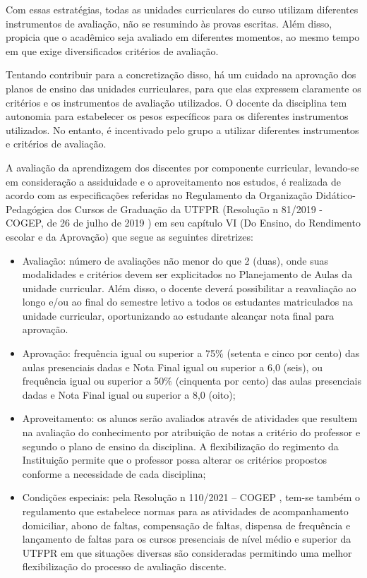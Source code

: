 Com essas estratégias, todas as unidades curriculares do curso utilizam diferentes instrumentos de avaliação, não se resumindo às provas escritas. Além disso, propicia que o acadêmico seja avaliado em diferentes momentos, ao mesmo tempo em que exige diversificados critérios de avaliação. 

Tentando contribuir para a concretização disso, há um cuidado na aprovação dos planos de ensino das unidades curriculares, para que elas expressem claramente os critérios e os instrumentos de avaliação utilizados. O docente da disciplina tem autonomia para estabelecer os pesos específicos para os diferentes instrumentos utilizados. No entanto, é incentivado pelo grupo a utilizar diferentes instrumentos e critérios de avaliação. 

A avaliação da aprendizagem dos discentes por componente curricular, levando-se em consideração a assiduidade e o aproveitamento nos estudos, é realizada de acordo com as especificações referidas no Regulamento da Organização Didático-Pedagógica dos Cursos de Graduação da UTFPR (Resolução n\textordmasculine{} 81/2019 - COGEP, de 26 de julho de 2019 \cite{rodp}) em seu capítulo VI (Do Ensino, do Rendimento escolar e da Aprovação) que segue as seguintes diretrizes: 

\begin{itemize}
	\item Avaliação: número de avaliações não menor do que 2 (duas), onde suas modalidades e critérios devem ser explicitados no Planejamento de Aulas da unidade curricular. Além disso, o docente deverá possibilitar a reavaliação ao longo e/ou ao final do semestre letivo a todos os estudantes matriculados na unidade curricular, oportunizando ao estudante alcançar nota final para aprovação.
	\item Aprovação: frequência igual ou superior a 75$\%$ (setenta e cinco por cento) das aulas presenciais dadas e Nota Final igual ou superior a 6,0 (seis), ou frequência igual ou superior a 50$\%$ (cinquenta por cento) das aulas presenciais dadas e Nota Final igual ou superior a 8,0 (oito);
	\item Aproveitamento: os alunos serão avaliados através de atividades que resultem na avaliação do conhecimento por atribuição de notas a critério do professor e segundo o plano de ensino da disciplina. A flexibilização do regimento da Instituição permite que o professor possa alterar os critérios propostos conforme a necessidade de cada disciplina;
	\item  Condições especiais: pela Resolução n\textordmasculine{} 110/2021 – COGEP \cite{cogep110}, tem-se também o regulamento que estabelece normas para as atividades de acompanhamento domiciliar, abono de faltas, compensação de faltas, dispensa de frequência e lançamento de faltas para os cursos presenciais de nível médio e superior da UTFPR em que situações diversas são consideradas permitindo uma melhor flexibilização do processo de avaliação discente.
\end{itemize}

